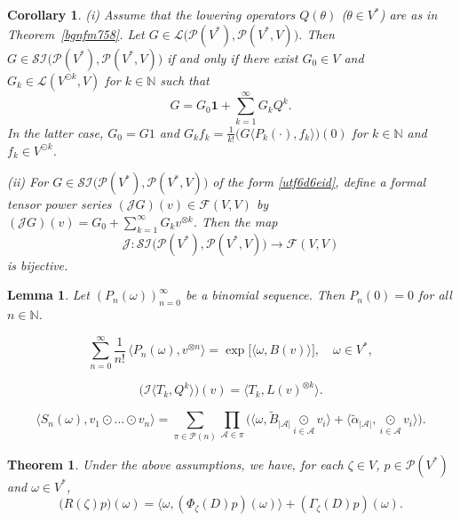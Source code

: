\documentclass[10pt,a4paper]{amsart}
\newtheorem{theorem}{Theorem}
\newtheorem{corollary}{Corollary}
\newtheorem{lemma}{Lemma}
\begin{document}
\begin{corollary}\label{xesa4aq46q327y} 
{\rm (i)} Assume that the  lowering operators $Q(\theta)$  ($\theta\in V^*$) are as in Theorem~\ref{bgnfm758}.  Let $G \in \mathcal L\big(\mathcal P  (V^*),\mathcal P  (V^*,V)\big)$. Then  $G\in\mathcal{SI}\big(\mathcal P  (V^*),\mathcal P(V^*,V)\big)$ if and only if there exist $G_0\in V$ and $G_k\in \mathcal L(V^{\odot k},V)$ for $k\in \mathbb N$ such that
\begin{equation}\label{utf6d6eid}
G=G_0\mathbf 1+\sum_{k=1}^\infty G_k
Q^{k}.\end{equation}
In the latter case,  
$G_0=G 1$ and $ G_k f_k  =\frac1{k!}\big(G\langle P_k(\cdot),f_k\rangle\big)(0)$ for $k\in\mathbb N$ and $f_k\in V^{\odot   k}$.

{\rm (ii)} For   $G\in\mathcal{SI}\big(\mathcal P  (V^*),\mathcal P(V^*,V)\big)$ of the form \eqref{utf6d6eid}, define a formal tensor power series $(\mathcal JG)(v)\in \mathcal F(V,V)$ by
$(\mathcal JG)(v)=G_0+\sum_{k=1}^\infty G_kv^{\otimes k}$.
Then the map
$$\mathcal J:\mathcal{SI}\big(\mathcal P  (V^*),\mathcal P(V^*,V)\big)\to \mathcal F(V,V)$$
 is bijective.
\end{corollary}

\begin{lemma}
\label{gfyrdr6ew64ui}
Let $(P_n(\omega))_{n=0}^\infty$ be a binomial sequence. Then $P_n(0)=0$ for all $n\in\mathbb N$.
\end{lemma}

\begin{equation}\label{trse5sw5w}
\sum_{n=0}^\infty \frac{1}{n!}\,\langle P_n(\omega),v^{\otimes n}\rangle= \exp\big[\langle \omega,B(v)\rangle\big],\quad \omega \in V^*,
\end{equation}

\begin{equation}\label{ctxsts}
\big(\mathcal I\langle T_k,Q^{k}\rangle \big)(v)=\langle T_k,L(v)^{\otimes k}\rangle.
 \end{equation}

\begin{equation}
\langle S_n(\omega),v_1\odot\dots\odot v_n\rangle=\sum_{\pi\in\mathcal P(n)}\prod_{\mathcal A\in\pi}\Big(\big\langle\omega,\tilde B_{|\mathcal A|}\underset{i\in \mathcal A}\odot v_i\big\rangle+\big\langle \tilde\alpha_{|\mathcal A|},\underset{i\in \mathcal A}\odot v_i\big\rangle\Big).\label{cxrtstset55}
\end{equation}

\begin{theorem}\label{dzerste7kui7} Under the above assumptions, we have, for each $\zeta\in V$, $p\in\mathcal P(V^*)$ and $\omega\in V^*$,
\begin{equation}\label{dtrd6t5swe5u4wu5}
\big(R(\zeta)p\big)(\omega)=
\big\langle\omega, (\Phi_\zeta(D)p)(\omega)\big\rangle+ (\Gamma_\zeta(D)p)(\omega). 
\end{equation}
\end{theorem}
\end{document}
